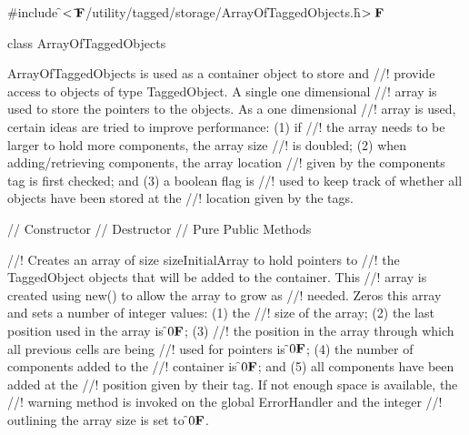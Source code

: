 
\indent \#include \f$<\tilde{ }{\bf F}$/utility/tagged/storage/ArrayOfTaggedObjects.h\f$>{\bf F}$

\indent class ArrayOfTaggedObjects

\indent{}

\indent ArrayOfTaggedObjects is used as a container object to store and
//! provide access to objects of type TaggedObject. A single one dimensional
//! array is used to store the pointers to the objects. As a one dimensional
//! array is used, certain ideas are tried to improve performance: (1) if
//! the array needs to be larger to hold more components, the array size
//! is doubled; (2) when adding/retrieving components, the array location
//! given by the components tag is first checked; and (3) a boolean flag is
//! used to keep track of whether all objects have been stored at the
//! location given by the tags.

\indent // Constructor
\indent // Destructor
\indent // Pure Public Methods

//! Creates an array of size \p sizeInitialArray to hold pointers to
//! the TaggedObject objects that will be added to the container. This
//! array is created using new() to allow the array to grow as
//! needed. Zeros this array and sets a number of integer values: (1) the
//! size of the array; (2) the last position used in the array is \f$0{\bf F}$; (3)
//! the position in the array through which all previous cells are being
//! used for pointers is \f$0{\bf F}$; (4) the number of components added to the
//! container is \f$0{\bf F}$; and (5) all components have been added at the
//! position given by their tag. If not enough space is available, the
//! warning method is invoked on the global ErrorHandler and the integer
//! outlining the array size is set to \f$0{\bf F}$. 


